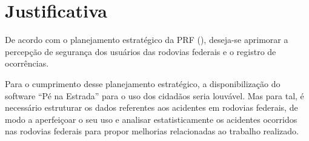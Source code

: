 \section[Justificativa]{Justificativa}

De acordo com o planejamento estratégico da PRF (\citeyear{prf13}), deseja-se aprimorar a
percepção de segurança dos usuários das rodovias federais e o registro de ocorrências.

Para o cumprimento desse planejamento estratégico, a disponibilização do software
“Pé na Estrada” para o uso dos cidadãos seria louvável. Mas para tal, é necessário
estruturar os dados referentes aos acidentes em rodovias federais, de modo a aperfeiçoar o
seu uso e analisar estatisticamente os acidentes ocorridos nas rodovias federais para
propor melhorias relacionadas ao trabalho realizado.